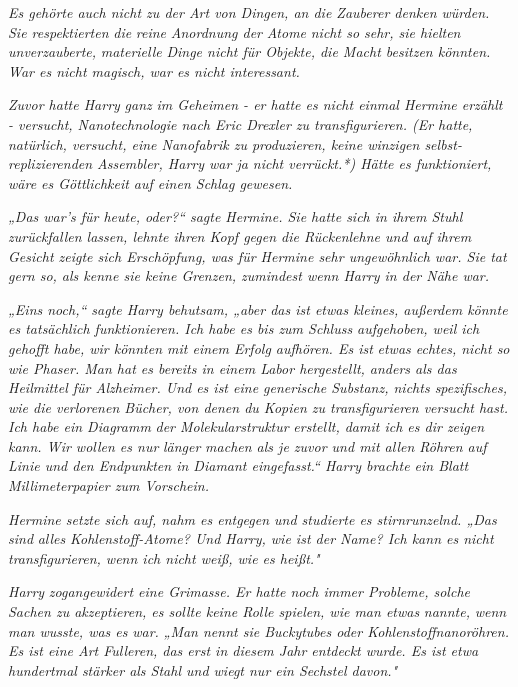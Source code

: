 {\emph{Es gehörte auch nicht zu der Art von Dingen, an die Zauberer denken würden. Sie respektierten} \emph{die} \emph{reine} \emph{\emph{Anordnung der}} \emph{\emph{Atome}} \emph{nicht so sehr, sie hielten unverzauberte,} \emph{\emph{materielle}} \emph{Dinge nicht für Objekte, die Macht besitzen könnten. War es nicht magisch, war es nicht interessant.}

\emph{Zuvor hatte Harry} \emph{\emph{ganz}} \emph{im Geheimen - er hatte es nicht einmal Hermine erzählt - versucht, Nanotechnologie nach Eric Drexler zu transfigurieren. (Er hatte, natürlich, versucht, eine Nanofabrik zu produzieren, keine winzigen selbst-replizierenden Assembler, Harry war ja nicht verrückt.*) Hätte es funktioniert, wäre es Göttlichkeit auf einen Schlag gewesen.}

\emph{„Das war's für heute, oder?“ sagte Hermine. Sie hatte sich in ihrem Stuhl zurückfallen lassen, lehnte ihren Kopf gegen die Rückenlehne und auf ihrem Gesicht zeigte sich Erschöpfung, was für Hermine sehr ungewöhnlich war. Sie tat gern so, als kenne sie keine Grenzen, zumindest wenn Harry in der Nähe war.}

\emph{„Eins noch,“ sagte Harry behutsam, „aber das ist etwas kleines, außerdem könnte es tatsächlich funktionieren. Ich habe es bis zum Schluss aufgehoben, weil ich gehofft habe, wir könnten mit einem Erfolg aufhören. Es ist} \emph{etwas echtes, nicht so wie Phaser. Man hat es bereits in einem Labor hergestellt, anders als das Heilmittel für Alzheimer. Und es ist eine generische Substanz, nichts spezifisches, wie die verlorenen Bücher, von denen du Kopien zu transfigurieren versucht hast. Ich habe ein Diagramm} \emph{der Molekularstruktur} \emph{erstellt, damit ich es dir zeigen kann. Wir wollen es nur} \emph{\emph{länger}} \emph{machen als je zuvor und mit allen Röhren auf Linie und den Endpunkten in Diamant eingefasst.“ Harry brachte ein Blatt Millimeterpapier zum Vorschein.}

\emph{Hermine setzte sich auf, nahm es entgegen und studierte es stirnrunzelnd. „Das sind} \emph{\emph{alles}} \emph{Kohlenstoff-Atome? Und Harry, wie ist der Name? Ich kann es nicht transfigurieren, wenn ich nicht weiß, wie es heißt."}

\emph{Harry} \emph{zogangewidert eine Grimasse. Er hatte noch immer Probleme, solche Sachen zu akzeptieren, es sollte keine Rolle spielen, wie man etwas} \emph{\emph{nannte,}} \emph{wenn man wusste, was es} \emph{\emph{war.}} \emph{„Man nennt sie Buckytubes oder Kohlenstoffnanoröhren. Es ist eine Art Fulleren, das erst in diesem Jahr entdeckt wurde. Es ist etwa hundertmal stärker als Stahl und wiegt nur ein Sechstel davon."}

}
